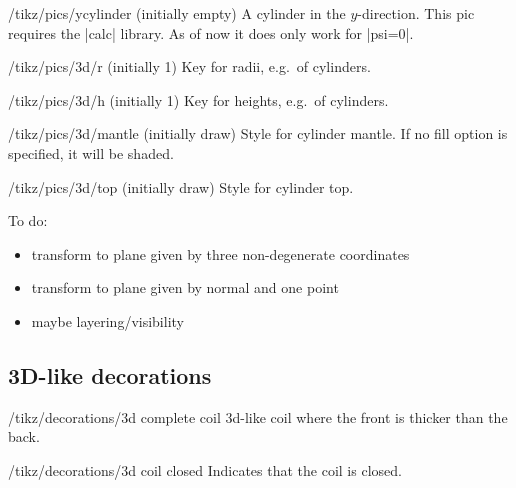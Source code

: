 \documentclass[a4paper]{ltxdoc}
\begin{document}
\begin{key}{/tikz/pics/ycylinder (initially empty)}
 A cylinder in the $y$-direction. This pic requires the |calc| library. 
 As of now it does only work for |psi=0|.
\end{key}
\begin{key}{/tikz/pics/3d/r (initially 1)}
 Key for radii, e.g.\ of cylinders.
\end{key}
\begin{key}{/tikz/pics/3d/h (initially 1)}
 Key for heights,  e.g.\ of cylinders.
\end{key}
\begin{key}{/tikz/pics/3d/mantle (initially draw)}
 Style for cylinder mantle. If no fill option is specified, it will be shaded.
\end{key}
\begin{key}{/tikz/pics/3d/top (initially draw)}
 Style for cylinder top. 
\end{key}


\begin{codeexample}[width=3cm]
\end{codeexample}

To do:
\begin{itemize}
 \item transform to plane given by three non-degenerate coordinates
 \item transform to plane given by normal and one point
 \item maybe layering/visibility
\end{itemize}

\subsection{3D-like decorations}

\begin{key}{/tikz/decorations/3d complete  coil}
        3d-like coil where the front is thicker than the back.
\end{key}

\begin{key}{/tikz/decorations/3d coil closed}
        Indicates that the coil is closed.
\end{key}


\begin{codeexample}[width=8cm]
\end{codeexample}
\end{document}
